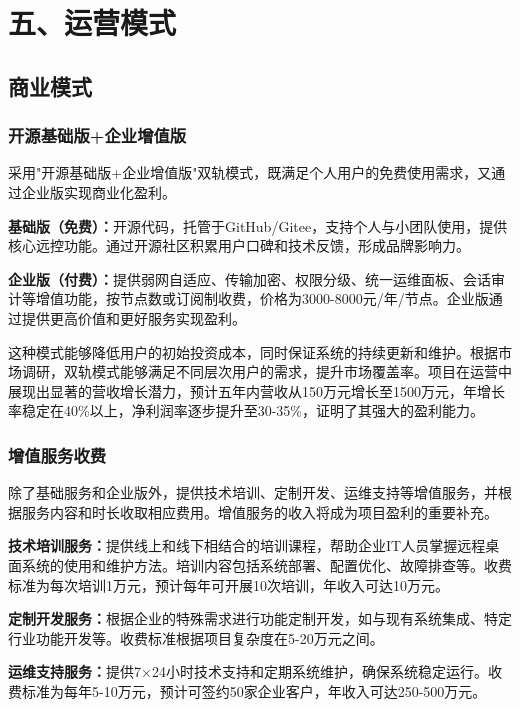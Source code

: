 \documentclass[12pt,a4paper]{article}
\begin{document}
\section{五、运营模式}

\subsection{商业模式}

\subsubsection{开源基础版+企业增值版}
采用"开源基础版+企业增值版"双轨模式，既满足个人用户的免费使用需求，又通过企业版实现商业化盈利。

\textbf{基础版（免费）：}开源代码，托管于GitHub/Gitee，支持个人与小团队使用，提供核心远控功能。通过开源社区积累用户口碑和技术反馈，形成品牌影响力。

\textbf{企业版（付费）：}提供弱网自适应、传输加密、权限分级、统一运维面板、会话审计等增值功能，按节点数或订阅制收费，价格为3000-8000元/年/节点。企业版通过提供更高价值和更好服务实现盈利。

这种模式能够降低用户的初始投资成本，同时保证系统的持续更新和维护。根据市场调研，双轨模式能够满足不同层次用户的需求，提升市场覆盖率。项目在运营中展现出显著的营收增长潜力，预计五年内营收从150万元增长至1500万元，年增长率稳定在40\%以上，净利润率逐步提升至30-35\%，证明了其强大的盈利能力。

\subsubsection{增值服务收费}
除了基础服务和企业版外，提供技术培训、定制开发、运维支持等增值服务，并根据服务内容和时长收取相应费用。增值服务的收入将成为项目盈利的重要补充。

\textbf{技术培训服务：}提供线上和线下相结合的培训课程，帮助企业IT人员掌握远程桌面系统的使用和维护方法。培训内容包括系统部署、配置优化、故障排查等。收费标准为每次培训1万元，预计每年可开展10次培训，年收入可达10万元。

\textbf{定制开发服务：}根据企业的特殊需求进行功能定制开发，如与现有系统集成、特定行业功能开发等。收费标准根据项目复杂度在5-20万元之间。

\textbf{运维支持服务：}提供7×24小时技术支持和定期系统维护，确保系统稳定运行。收费标准为每年5-10万元，预计可签约50家企业客户，年收入可达250-500万元。
\end{document}
